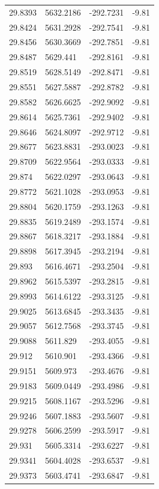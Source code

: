 \begin{table}[H]
\begin{tabular}{llll}
29.8393 & 5632.2186 & -292.7231 & -9.81 \\
29.8424 & 5631.2928 & -292.7541 & -9.81 \\
29.8456 & 5630.3669 & -292.7851 & -9.81 \\
29.8487 & 5629.441 & -292.8161 & -9.81 \\
29.8519 & 5628.5149 & -292.8471 & -9.81 \\
29.8551 & 5627.5887 & -292.8782 & -9.81 \\
29.8582 & 5626.6625 & -292.9092 & -9.81 \\
29.8614 & 5625.7361 & -292.9402 & -9.81 \\
29.8646 & 5624.8097 & -292.9712 & -9.81 \\
29.8677 & 5623.8831 & -293.0023 & -9.81 \\
29.8709 & 5622.9564 & -293.0333 & -9.81 \\
29.874 & 5622.0297 & -293.0643 & -9.81 \\
29.8772 & 5621.1028 & -293.0953 & -9.81 \\
29.8804 & 5620.1759 & -293.1263 & -9.81 \\
29.8835 & 5619.2489 & -293.1574 & -9.81 \\
29.8867 & 5618.3217 & -293.1884 & -9.81 \\
29.8898 & 5617.3945 & -293.2194 & -9.81 \\
29.893 & 5616.4671 & -293.2504 & -9.81 \\
29.8962 & 5615.5397 & -293.2815 & -9.81 \\
29.8993 & 5614.6122 & -293.3125 & -9.81 \\
29.9025 & 5613.6845 & -293.3435 & -9.81 \\
29.9057 & 5612.7568 & -293.3745 & -9.81 \\
29.9088 & 5611.829 & -293.4055 & -9.81 \\
29.912 & 5610.901 & -293.4366 & -9.81 \\
29.9151 & 5609.973 & -293.4676 & -9.81 \\
29.9183 & 5609.0449 & -293.4986 & -9.81 \\
29.9215 & 5608.1167 & -293.5296 & -9.81 \\
29.9246 & 5607.1883 & -293.5607 & -9.81 \\
29.9278 & 5606.2599 & -293.5917 & -9.81 \\
29.931 & 5605.3314 & -293.6227 & -9.81 \\
29.9341 & 5604.4028 & -293.6537 & -9.81 \\
29.9373 & 5603.4741 & -293.6847 & -9.81 \\

\end{tabular}
\end{table}

